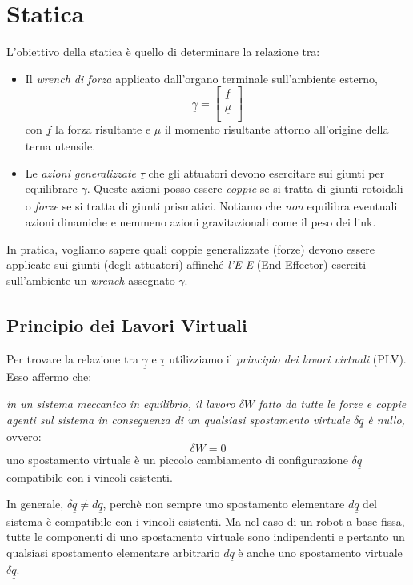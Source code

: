 \chapter{Statica}
L'obiettivo della statica è quello di determinare la relazione tra:
\begin{itemize}
	\item Il \emph{wrench di forza} applicato dall'organo terminale sull'ambiente esterno,
	\begin{equation}
		\underline{\gamma} = 
		\begin{bmatrix}
			\underline{f} \\
			\underline{\mu} \\
		\end{bmatrix}
	\end{equation} con $\underline{f}$ la forza risultante e $\underline{\mu}$ il momento risultante attorno all'origine della terna utensile.
	\item Le \emph{azioni generalizzate} $\underline{\tau}$ che gli attuatori devono esercitare sui giunti per equilibrare $\underline{\gamma}$. Queste azioni posso essere \emph{coppie} se si tratta di giunti rotoidali o \emph{forze} se si tratta di giunti prismatici. Notiamo che \emph{non} equilibra eventuali azioni dinamiche e nemmeno azioni gravitazionali come il peso dei link.
\end{itemize}

In pratica, vogliamo sapere quali coppie generalizzate (forze) devono essere applicate sui giunti (degli attuatori) affinché \emph{l'E-E} (End Effector) eserciti sull'ambiente un \emph{wrench} assegnato $\underline{\gamma}$.
\section{Principio dei Lavori Virtuali}
Per trovare la relazione tra $\underline{\gamma}$ e $\underline{\tau}$ utilizziamo il \emph{principio dei lavori virtuali} (PLV). Esso affermo che:

\textit{in un sistema meccanico in equilibrio, il lavoro $\delta W$ fatto da tutte le forze e coppie agenti sul sistema in conseguenza di un qualsiasi spostamento virtuale $\delta \underline{q}$ è nullo,} ovvero:
\begin{equation}
	\delta W = 0
\end{equation}
uno spostamento virtuale è un piccolo cambiamento di configurazione $\delta \underline{q}$ compatibile con i vincoli esistenti. 

In generale, $\delta \underline{q} \neq d\underline{q}$, perchè non sempre uno spostamento elementare $d\underline{q}$ del sistema è compatibile con i vincoli esistenti. Ma nel caso di un robot a base fissa, tutte le componenti di uno spostamento virtuale sono indipendenti e pertanto un qualsiasi spostamento elementare arbitrario $d\underline{q}$ è anche uno spostamento virtuale $\delta \underline{q}$.

